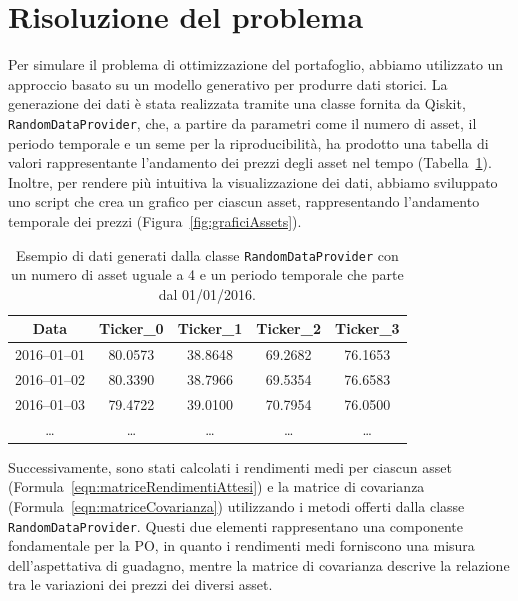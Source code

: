 \section{Risoluzione del problema}\label{sec:qiskit}

Per simulare il problema di ottimizzazione del portafoglio, 
abbiamo utilizzato un approccio basato su un modello generativo 
per produrre dati storici. La generazione dei dati è stata 
realizzata tramite una classe fornita da Qiskit, \texttt{RandomDataProvider}, 
che, a partire da parametri come il numero di asset, il 
periodo temporale e un seme per la riproducibilità, ha 
prodotto una tabella di valori rappresentante l'andamento dei 
prezzi degli asset nel tempo (Tabella~\ref{tab:dati-tickers}). 
Inoltre, per rendere più intuitiva la visualizzazione dei dati, 
abbiamo sviluppato uno script che crea un grafico per ciascun asset, 
rappresentando l'andamento temporale dei prezzi (Figura~\ref{fig:graficiAssets}).

\begin{table}[h]
    \centering
    \renewcommand{\arraystretch}{1.5}
    \begin{tabular}{|c|c|c|c|c|}
    \hline
    \textbf{Data} & \textbf{Ticker\_0} & \textbf{Ticker\_1} & \textbf{Ticker\_2} & \textbf{Ticker\_3} \\
    \hline
    2016--01--01 & 80.0573 & 38.8648 & 69.2682 & 76.1653 \\
    \hline
    2016--01--02 & 80.3390 & 38.7966 & 69.5354 & 76.6583 \\
    \hline
    2016--01--03 & 79.4722 & 39.0100 & 70.7954 & 76.0500 \\
    \hline
    \ldots & \ldots & \ldots & \ldots & \ldots \\
    \hline
    \end{tabular}
    \caption{Esempio di dati generati dalla classe \texttt{RandomDataProvider} 
        con un numero di asset uguale a 4 e un periodo temporale che parte dal 01/01/2016.}
    \label{tab:dati-tickers}
\end{table}

Successivamente, sono stati calcolati i rendimenti medi per ciascun asset 
(Formula~\ref{eqn:matriceRendimentiAttesi}) e la matrice di covarianza 
(Formula~\ref{eqn:matriceCovarianza}) utilizzando i metodi offerti dalla 
classe \texttt{RandomDataProvider}. Questi due elementi rappresentano una 
componente fondamentale per la PO, in quanto i 
rendimenti medi forniscono una misura dell'aspettativa di guadagno, mentre 
la matrice di covarianza descrive la relazione tra le variazioni dei prezzi 
dei diversi asset.

